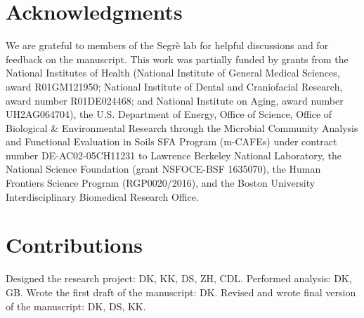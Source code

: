 
\section*{Acknowledgments}

We are grateful to members of the Segrè lab for helpful discussions and for feedback on the manuscript. This work was partially funded by grants from the National Institutes of Health (National Institute of General Medical Sciences, award R01GM121950; National Institute of Dental and Craniofacial Research, award number R01DE024468; and National Institute on Aging, award number UH2AG064704), the U.S. Department of Energy, Office of Science, Office of Biological & Environmental Research through the Microbial Community Analysis and Functional Evaluation in Soils SFA Program (m-CAFEs) under contract number DE-AC02-05CH11231 to Lawrence Berkeley National Laboratory, the National Science Foundation (grant NSFOCE-BSF 1635070), the Human Frontiers Science Program (RGP0020/2016), and the Boston University Interdisciplinary Biomedical Research Office. 

\section*{Contributions}
Designed the research project: DK, KK, DS, ZH, CDL. Performed analysis: DK, GB. Wrote the first draft of the manuscript: DK. Revised and wrote final version of the manuscript: DK, DS, KK.
